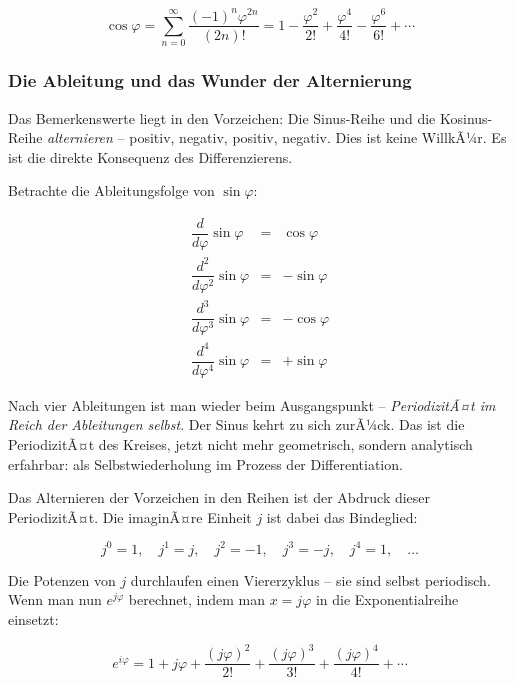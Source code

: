﻿\documentclass[a4paper,12pt]{article}
\theoremstyle{definition}
\begin{document}
\begin{equation}
	\cos\varphi = \sum_{n=0}^{\infty} \frac{(-1)^n \varphi^{2n}}{(2n)!}
	= 1 - \frac{\varphi^2}{2!} + \frac{\varphi^4}{4!} - \frac{\varphi^6}{6!} + \cdots
\end{equation}

\subsubsection{Die Ableitung und das Wunder der Alternierung}

Das Bemerkenswerte liegt in den Vorzeichen: Die Sinus-Reihe und die Kosinus-Reihe
\textit{alternieren} -- positiv, negativ, positiv, negativ. Dies ist keine
WillkÃ¼r. Es ist die direkte Konsequenz des Differenzierens.

Betrachte die Ableitungsfolge von $\sin\varphi$:

\begin{equation}
	\begin{array}{rcl}
		\dfrac{d}{d\varphi}\sin\varphi  &=& \cos\varphi \\[6pt]
		\dfrac{d^2}{d\varphi^2}\sin\varphi &=& -\sin\varphi \\[6pt]
		\dfrac{d^3}{d\varphi^3}\sin\varphi &=& -\cos\varphi \\[6pt]
		\dfrac{d^4}{d\varphi^4}\sin\varphi &=& +\sin\varphi
	\end{array}
\end{equation}

Nach vier Ableitungen ist man wieder beim Ausgangspunkt -- \textit{PeriodizitÃ¤t
	im Reich der Ableitungen selbst}. Der Sinus kehrt zu sich zurÃ¼ck. Das ist die
PeriodizitÃ¤t des Kreises, jetzt nicht mehr geometrisch, sondern analytisch erfahrbar:
als Selbstwiederholung im Prozess der Differentiation.

Das Alternieren der Vorzeichen in den Reihen ist der Abdruck dieser PeriodizitÃ¤t.
Die imaginÃ¤re Einheit $j$ ist dabei das Bindeglied:

\begin{equation}
	j^0 = 1, \quad j^1 = j, \quad j^2 = -1, \quad j^3 = -j, \quad j^4 = 1, \quad \ldots
\end{equation}

Die Potenzen von $j$ durchlaufen einen Viererzyklus -- sie sind selbst periodisch.
Wenn man nun $e^{j\varphi}$ berechnet, indem man $x = j\varphi$ in die
Exponentialreihe einsetzt:

\begin{equation}
	e^{i\varphi} = 1 + j\varphi + \frac{(j\varphi)^2}{2!} + \frac{(j\varphi)^3}{3!}
	+ \frac{(j\varphi)^4}{4!} + \cdots
\end{equation}
\end{document}
